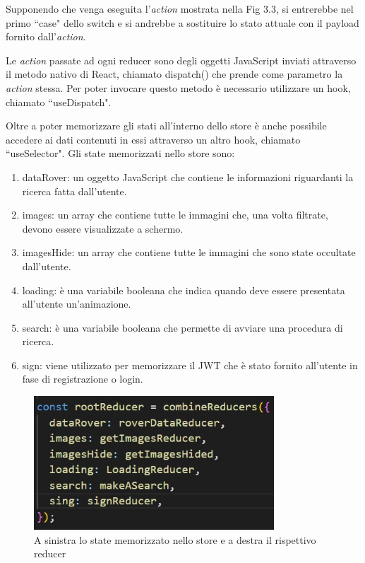 Supponendo che venga eseguita l'\textit{action} mostrata nella Fig 3.3, si entrerebbe nel primo ``case" dello switch e si andrebbe a sostituire lo stato attuale con il payload fornito dall'\textit{action}.

Le \textit{action} passate ad ogni reducer sono degli oggetti JavaScript inviati attraverso il metodo nativo di React, chiamato dispatch() che prende come parametro la \textit{action} stessa. Per poter invocare questo metodo
\`e necessario utilizzare un hook, chiamato ``useDispatch".

Oltre a poter memorizzare gli stati all'interno dello store \`e anche possibile accedere ai dati contenuti in essi attraverso un altro hook, chiamato ``useSelector".
Gli state memorizzati nello store sono:
\begin{enumerate}
    \item dataRover: un oggetto JavaScript che contiene le informazioni riguardanti la ricerca fatta dall'utente.
    \item images: un array che contiene tutte le immagini che, una volta filtrate, devono essere visualizzate a schermo.
    \item imagesHide: un array che contiene tutte le immagini che sono state occultate dall'utente.
    \item loading: \`e una variabile booleana che indica quando deve essere presentata all'utente un'animazione.
    \item search: \`e una variabile booleana che permette di avviare una procedura di ricerca.
    \item sign: viene utilizzato per memorizzare il JWT che \`e stato fornito all'utente in fase di registrazione o login.
\end{enumerate}
\begin{figure}[h]
    \centering
    \includegraphics[width=9cm, height=5cm]{images/state.jpg}
    \caption[differenzeiteot]{A sinistra lo state memorizzato nello store e a destra il rispettivo reducer}
    \label{fig:state}
\end{figure}
